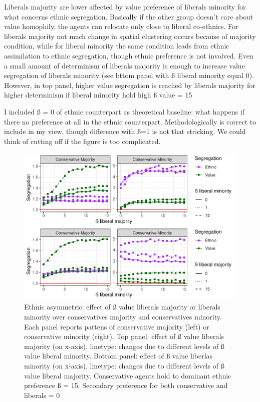 \documentclass[
]{article}
\begin{document}
Liberals majority are lower affected by value preference of liberals
minority for what concerns ethnic segregation. Basically if the other
group doesn't care about value homophily, the agents can relocate only
close to liberal co-ethnics. For liberals majority not much change in
spatial clustering occurs because of majority condition, while for
liberal minority the same condition leads from ethnic assimilation to
ethnic segregation, though ethnic preference is not involved. Even a
small amount of determinism of liberals majority is enough to increase
value segregation of liberals minority (see bttom panel with ß liberal
minority equal 0). However, in top panel, higher value segregation is
reached by liberals majority for higher determinism if liberal minority
hold high ß value = 15

I included ß = 0 of ethnic counterpart as theoretical baseline: what
happens if there no preference at all in the ethnic counterpart.
Methodologically is correct to include in my view, though difference
with ß=1 is not that stricking. We could think of cutting off if the
figure is too complicated.

\begin{figure}[H]

{\centering \includegraphics[width=1\linewidth]{ev_rum_files/figure-latex/asm_lib_con-1} 

}

\caption{Ethnic asymmetric: effect of ß value liberals majority or liberals minority over conservatives majority and conservatives minority. Each panel reports pattens of conservative majority (left) or conservative minority (right). Top panel: effect of ß value liberals majority (on x-axis), linetype: changes due to different levels of ß value liberal minority. Bottom panel: effect of ß value liberlas minority (on x-axis), linetype: changes due to different levels of ß value liberal majority. Conservative agents hold to dominant ethnic preference ß = 15. Secondary preference for both conservative and liberals = 0}\label{fig:asm_lib_con}
\end{figure}
\end{document}
